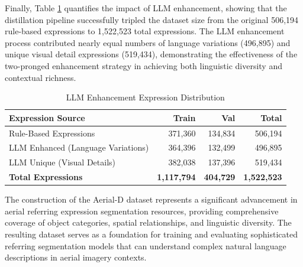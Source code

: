 Finally, Table \ref{tab:llm_enhancement_stats} quantifies the impact of LLM enhancement, showing that the distillation pipeline successfully tripled the dataset size from the original 506,194 rule-based expressions to 1,522,523 total expressions. The LLM enhancement process contributed nearly equal numbers of language variations (496,895) and unique visual detail expressions (519,434), demonstrating the effectiveness of the two-pronged enhancement strategy in achieving both linguistic diversity and contextual richness.

\begin{table}[H]
\centering
\caption{LLM Enhancement Expression Distribution}
\label{tab:llm_enhancement_stats}
\begin{tabular}{@{}lrrr@{}}
\toprule
\textbf{Expression Source} & \textbf{Train} & \textbf{Val} & \textbf{Total} \\
\midrule
Rule-Based Expressions & 371,360 & 134,834 & 506,194 \\
LLM Enhanced (Language Variations) & 364,396 & 132,499 & 496,895 \\
LLM Unique (Visual Details) & 382,038 & 137,396 & 519,434 \\
\midrule
\textbf{Total Expressions} & \textbf{1,117,794} & \textbf{404,729} & \textbf{1,522,523} \\
\bottomrule
\end{tabular}
\end{table}

The construction of the Aerial-D dataset represents a significant advancement in aerial referring expression segmentation resources, providing comprehensive coverage of object categories, spatial relationships, and linguistic diversity. The resulting dataset serves as a foundation for training and evaluating sophisticated referring segmentation models that can understand complex natural language descriptions in aerial imagery contexts.
